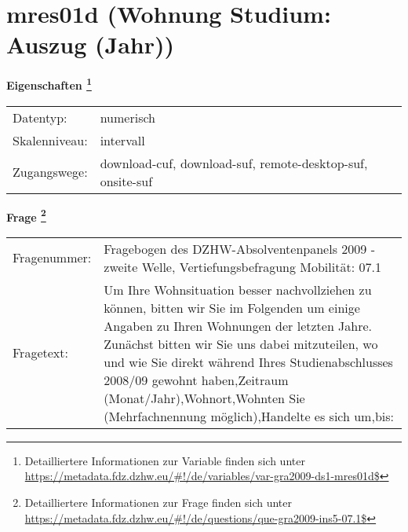 
    \setcounter{footnote}{0}

    \vspace*{-1.8cm}
	\section{mres01d (Wohnung Studium: Auszug (Jahr))}
	\label{section:mres01d}



    \vspace*{0.5cm}
    \noindent\textbf{Eigenschaften
	\footnote{Detailliertere Informationen zur Variable finden sich unter
		\url{https://metadata.fdz.dzhw.eu/\#!/de/variables/var-gra2009-ds1-mres01d$}}}\\
	\begin{tabularx}{\hsize}{@{}lX}
	Datentyp: & numerisch \\
	Skalenniveau: & intervall \\
	Zugangswege: &
	  download-cuf, 
	  download-suf, 
	  remote-desktop-suf, 
	  onsite-suf
 \\
    \end{tabularx}



				\vspace*{0.5cm}
                \noindent\textbf{Frage
	                \footnote{Detailliertere Informationen zur Frage finden sich unter
		              \url{https://metadata.fdz.dzhw.eu/\#!/de/questions/que-gra2009-ins5-07.1$}}}\\
				\begin{tabularx}{\hsize}{@{}lX}
					Fragenummer: &
					  Fragebogen des DZHW-Absolventenpanels 2009 - zweite Welle, Vertiefungsbefragung Mobilität:
					  07.1
 \\
					Fragetext: & Um Ihre Wohnsituation besser nachvollziehen zu können, bitten wir Sie im Folgenden um einige Angaben zu Ihren Wohnungen der letzten Jahre. Zunächst bitten wir Sie uns dabei mitzuteilen, wo und wie Sie direkt während Ihres Studienabschlusses 2008/09 gewohnt haben,Zeitraum (Monat/Jahr),Wohnort,Wohnten Sie (Mehrfachnennung möglich),Handelte es sich um,bis: \\
				\end{tabularx}





